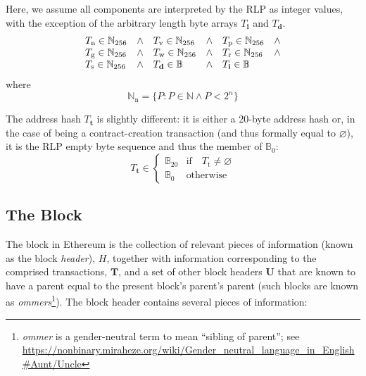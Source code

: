 \documentclass[9pt,oneside]{amsart}
\makeatletter
\newcommand{\linkdest}[1]{\Hy@raisedlink{\hypertarget{#1}{}}}
\makeatother
\begin{document}
\begin{multicols}{2}
Here, we assume all components are interpreted by the RLP as integer values, with the exception of the arbitrary length byte arrays $T_{\mathbf{i}}$ and $T_{\mathbf{d}}$.
\begin{equation}
\begin{array}[t]{lclclc}
T_{\mathrm{n}} \in \mathbb{N}_{256} & \wedge & T_{\mathrm{v}} \in \mathbb{N}_{256} & \wedge & T_{\mathrm{p}} \in \mathbb{N}_{256} & \wedge \\
T_{\mathrm{g}} \in \mathbb{N}_{256} & \wedge & T_{\mathrm{w}} \in \mathbb{N}_{256} & \wedge & T_{\mathrm{r}} \in \mathbb{N}_{256} & \wedge \\
T_{\mathrm{s}} \in \mathbb{N}_{256} & \wedge & T_{\mathbf{d}} \in \mathbb{B} & \wedge & T_{\mathbf{i}} \in \mathbb{B}
\end{array}
\end{equation}
where
\begin{equation}
\mathbb{N}_{\mathrm{n}} = \{ P: P \in \mathbb{N} \wedge P < 2^n \}
\end{equation}

The address hash $T_{\mathbf{t}}$ is slightly different: it is either a 20-byte address hash or, in the case of being a contract-creation transaction (and thus formally equal to $\varnothing$), it is the RLP empty byte sequence and thus the member of $\mathbb{B}_0$:
\begin{equation}
T_{\mathbf{t}} \in \begin{cases} \mathbb{B}_{20} & \text{if} \quad T_{\mathrm{t}} \neq \varnothing \\
\mathbb{B}_{0} & \text{otherwise}\end{cases}
\end{equation}

\subsection{The Block}\linkdest{block}\label{subsec:The_Block}

The block in Ethereum is the collection of relevant pieces of information (known as the block \textit{header}), $H$, together with information corresponding to the comprised transactions, $\mathbf{T}$,\hypertarget{ommerheaders}{} and a set of other block headers $\mathbf{U}$ that are known to have a parent equal to the present block's parent's parent (such blocks are known as \textit{ommers}\footnote{\textit{ommer} is a gender-neutral term to mean ``sibling of parent''; see \url{https://nonbinary.miraheze.org/wiki/Gender_neutral_language_in_English\#Aunt/Uncle}}). The block header contains several pieces of information:


\end{multicols}
\end{document}
